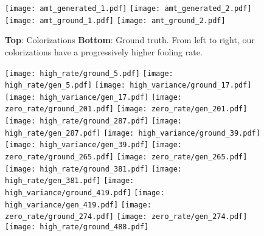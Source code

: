 \documentclass{article} \usepackage{iclr2021_conference,times}
\begin{document}
\begin{figure*}
  \subfloat
  {\texttt{[image: amt\_generated\_1.pdf]}
  \texttt{[image: amt\_generated\_2.pdf]}
  }
  \qquad
  \subfloat
  {\texttt{[image: amt\_ground\_1.pdf]}
  \texttt{[image: amt\_ground\_2.pdf]}
  }
  \caption{\textbf{Top}: Colorizations \textbf{Bottom}: Ground truth. From left to right, our colorizations have a progressively higher fooling rate.}
\label{fig:mturk_v2}
\end{figure*}

\begin{figure}[htp]
\setlength{\lineskip}{0pt}
  \centering
  \texttt{[image: high\_rate/ground\_5.pdf]}
  \texttt{[image: high\_rate/gen\_5.pdf]} \hfill
  \texttt{[image: high\_variance/ground\_17.pdf]}
  \texttt{[image: high\_variance/gen\_17.pdf]} \hfill
  \texttt{[image: zero\_rate/ground\_201.pdf]}
  \texttt{[image: zero\_rate/gen\_201.pdf]} \\
  \texttt{[image: high\_rate/ground\_287.pdf]}
  \texttt{[image: high\_rate/gen\_287.pdf]} \hfill
  \texttt{[image: high\_variance/ground\_39.pdf]}
  \texttt{[image: high\_variance/gen\_39.pdf]} \hfill
  \texttt{[image: zero\_rate/ground\_265.pdf]}
  \texttt{[image: zero\_rate/gen\_265.pdf]} \\
  \texttt{[image: high\_rate/ground\_381.pdf]}
  \texttt{[image: high\_rate/gen\_381.pdf]} \hfill
  \texttt{[image: high\_variance/ground\_419.pdf]}
  \texttt{[image: high\_variance/gen\_419.pdf]} \hfill
  \texttt{[image: zero\_rate/ground\_274.pdf]}
  \texttt{[image: zero\_rate/gen\_274.pdf]} \\
  \texttt{[image: high\_rate/ground\_488.pdf]}

\end{figure}
\end{document}
